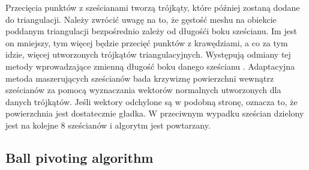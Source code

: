 Przecięcia punktów z sześcianami tworzą trójkąty, które później zostaną dodane do triangulacji. Należy zwrócić uwagę na to, że gęstość meshu na obiekcie poddanym triangulacji bezpośrednio zależy od długośći boku sześcianu. Im jest on mniejszy, tym więcej będzie przecięć punktów z krawędziami, a co za tym idzie, więcej utworzonych trójkątów triangulacyjnych. Występują odmiany tej metody wprowadzające zmienną długość boku danego sześcianu \cite{shu1995adaptive}. Adaptacyjna metoda maszerujących sześcianów bada krzywiznę powierzchni wewnątrz sześcianów za pomocą wyznaczania wektorów normalnych utworzonych dla danych trójkątów. Jeśli wektory odchylone są w podobną stronę, oznacza to, że powierzchnia jest dostatecznie gładka. W przeciwnym wypadku sześcian dzielony jest na kolejne 8 sześcianów i algorytm jest powtarzany. 

\subsection{Ball pivoting algorithm}



